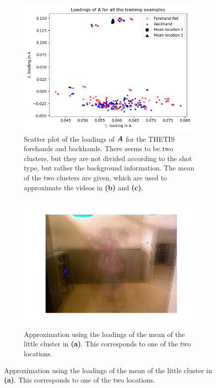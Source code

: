 \begin{figure}
    \centering
    \begin{subfigure}{\linewidth}
        \centering
        \includegraphics[width=0.65\linewidth]{Pics/06_results/scatter_loadings_THETIS.png}
        \captionsetup{width=.95\linewidth}
        \caption{Scatter plot of the loadings of $\boldsymbol{A}$ for the THETIS forehands and backhands. There seems to be two clusters, but they are not divided according to the shot type, but rather the background information. The mean of the two clusters are given, which are used to approximate the videos in \textbf{(b)} and \textbf{(c)}.}
    \end{subfigure}
    \begin{subfigure}{.45\linewidth}
        \centering
        \captionsetup{width=.95\linewidth}
        \includegraphics[width=\linewidth]{Pics/06_results/loc1.png}
        \caption{Approximation using the loadings of the mean of the little cluster in \textbf{(a)}. This corresponds to one of the two locations.}

\end{subfigure}
\end{figure}
